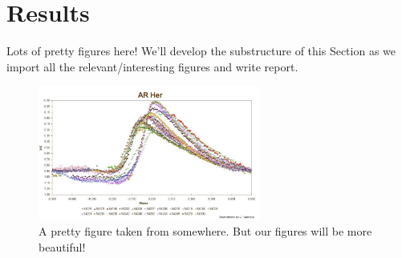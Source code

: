 

\section{Results\label{sec:results}}


Lots of pretty figures here! We'll develop the substructure of this Section as we import all the relevant/interesting figures and write report.



\begin{figure}[!ht]
\hskip 1.1in
\includegraphics[width=0.65\textwidth,angle=0]{figures/blazhko_effect_lc.png}
\caption{A pretty figure taken from somewhere. But our figures will be more beautiful!} 
\label{fig:random} 
\end{figure}


 